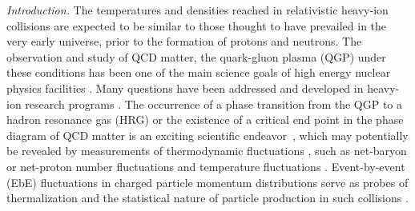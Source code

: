 \documentclass[aps,twocolumn,
prl,
superscriptaddress,nofootinbib,floatfix]{revtex4-2}
\begin{document}
\textit{Introduction.}\label{sec:introduction} The temperatures and densities reached in relativistic heavy-ion collisions are expected to be similar to those thought to have prevailed in the very early universe, prior to the formation of protons and neutrons. The observation and study of QCD matter, the quark-gluon plasma (QGP) under these conditions has been one of the main science goals of high energy nuclear physics facilities \cite{Shuryak:1980tp, Harris:1996zx, STAR:2005gfr, PHENIX:2004vcz, ALICE:2005vhb, Busza:2018rrf, STAR:2023jdd}. Many questions have been addressed and developed in heavy-ion research programs \cite{Busza:2018rrf}. The occurrence of a phase transition from the QGP to a hadron resonance gas (HRG) or the existence of a critical end point in the phase diagram of QCD matter is an exciting scientific endeavor~\cite{Stephanov:1998dy, Stephanov:1999zu, Fu:2019hdw, Gao:2020fbl, Gunkel:2021oya}, which may potentially be revealed by measurements of thermodynamic fluctuations \cite{STAR:2010vob, Bzdak:2019pkr, Chen:2024aom}, such as net-baryon or net-proton number fluctuations \cite{STAR:2020tga, STAR:2021fge, STAR:2022vlo,STAR:2022etb, STAR:2025zdq, Fu:2016tey, Fu:2021oaw, Fu:2023lcm, Lu:2025cls} and temperature fluctuations \cite{Gavin:2003cb,Cao:2021zhy}. Event-by-event (EbE) fluctuations in charged particle momentum distributions serve as probes of thermalization and the statistical nature of particle production in such collisions \cite{Heiselberg:2000fk, Jeon:2000wg, Voloshin:1999yf, Asakawa:2000wh,Stodolsky:1995ds}.  
\end{document}
